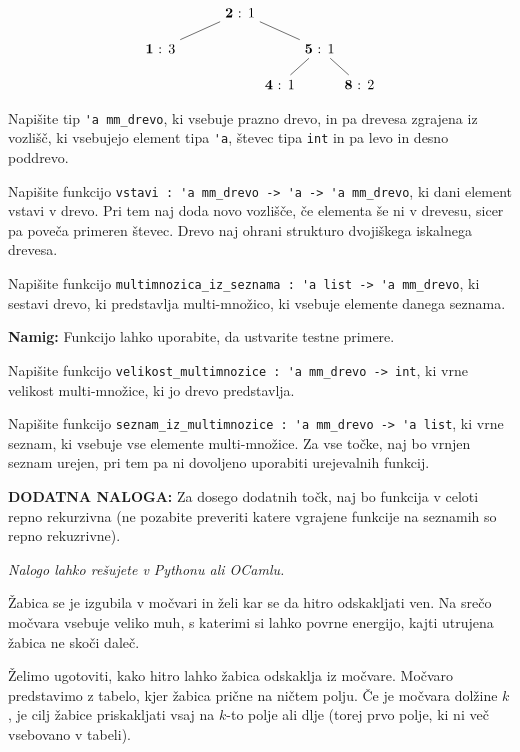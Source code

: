 \documentclass[arhiv]{../izpit}
\begin{document}
\[
  \begin{tikzpicture}[level distance=0.9cm,
    level 1/.style={sibling distance=4cm},
    level 2/.style={sibling distance=2cm},
    level 3/.style={sibling distance=2cm}
    ]
    \node {\textbf{2} : 1}
      child {node {\textbf{1} : 3}}
      child {node {\textbf{5} : 1}
        child {node {\textbf{4} : 1}}
        child {node {\textbf{8} : 2}}
      };
  \end{tikzpicture}
\]

\podnaloga
Napišite tip \verb|'a mm_drevo|, ki vsebuje prazno drevo, in pa drevesa zgrajena iz vozlišč, ki vsebujejo element tipa \verb|'a|, števec tipa \verb|int| in pa levo in desno poddrevo.

\podnaloga
Napišite funkcijo \verb|vstavi : 'a mm_drevo -> 'a -> 'a mm_drevo|, ki dani element vstavi v drevo. Pri tem naj doda novo vozlišče, če elementa še ni v drevesu, sicer pa poveča primeren števec. Drevo naj ohrani strukturo dvojiškega iskalnega drevesa.

\podnaloga
Napišite funkcijo \verb|multimnozica_iz_seznama : 'a list -> 'a mm_drevo|, ki sestavi drevo, ki predstavlja multi-množico, ki vsebuje elemente danega seznama.

\noindent\textbf{Namig:} Funkcijo lahko uporabite, da ustvarite testne primere. 

\podnaloga
Napišite funkcijo \verb|velikost_multimnozice : 'a mm_drevo -> int|, ki vrne velikost multi-množice, ki jo drevo predstavlja.

\podnaloga
Napišite funkcijo \verb|seznam_iz_multimnozice : 'a mm_drevo -> 'a list|, ki vrne seznam, ki vsebuje vse elemente multi-množice. Za vse točke, naj bo vrnjen seznam urejen, pri tem pa ni dovoljeno uporabiti urejevalnih funkcij.

\noindent\textbf{DODATNA NALOGA:} Za dosego dodatnih točk, naj bo funkcija v celoti repno rekurzivna (ne pozabite preveriti katere vgrajene funkcije na seznamih so repno rekuzrivne).

\prostor

\naloga[]
\emph{Nalogo lahko rešujete v Pythonu ali OCamlu.}

\vspace{5mm}
Žabica se je izgubila v močvari in želi kar se da hitro odskakljati ven. Na srečo močvara vsebuje veliko muh, s katerimi si lahko povrne energijo, kajti utrujena žabica ne skoči daleč.

Želimo ugotoviti, kako hitro lahko žabica odskaklja iz močvare. Močvaro predstavimo z tabelo, kjer žabica prične na ničtem polju. Če je močvara dolžine $k$, je cilj žabice priskakljati vsaj na $k$-to polje ali dlje (torej prvo polje, ki ni več vsebovano v tabeli).
\end{document}
